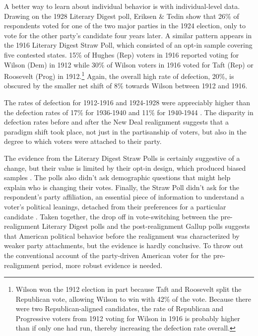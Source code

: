 \documentclass[11pt]{scrartcl}\usepackage[]{graphicx}\usepackage[]{color}
\begin{document}
A better way to learn about individual behavior is with individual-level data.  Drawing on the 1928 Literary Digest poll, Eriksen \& Tedin \citeyearpar{erikson1981partisan} show that 26\% of respondents voted for one of the two major parties in the 1924 election, only to vote for the other party's candidate four years later. A similar pattern appears in the 1916 Literary Digest Straw Poll, which consisted of an opt-in sample covering five contested states. 15\% of Hughes (Rep) voters in 1916 reported voting for Wilson (Dem) in 1912 while 30\% of Wilson voters in 1916 voted for Taft (Rep) or Roosevelt (Prog) in 1912.\footnote{Wilson won the 1912 election in part because Taft and Roosevelt split the Republican vote, allowing Wilson to win with 42\% of the vote. Because there were two Republican-aligned candidates, the rate of Republican and Progressive voters from 1912 voting for Wilson in 1916 is probably higher than if only one had run, thereby increasing the defection rate overall.} Again, the overall high rate of defection, 20\%, is obscured by the smaller net shift of 8\% towards Wilson between 1912 and 1916.  

The rates of defection for 1912-1916 and 1924-1928 were appreciably higher than the defection rates of 17\% for 1936-1940 and 11\% for 1940-1944 \citep{erikson1981partisan,key1966responsible}. The disparity in defection rates before and after the New Deal realignment suggests that a paradigm shift took place, not just in the partisanship of voters, but also in the degree to which voters were attached to their party.

The evidence from the Literary Digest Straw Polls is certainly suggestive of a change, but their value is limited by their opt-in design, which produced biased samples \citep{squire19881936}. The polls also didn't ask demographic questions that might help explain who is changing their votes. Finally, the Straw Poll didn't ask for the respondent's party affiliation, an essential piece of information to understand a voter's political leanings, detached from their preferences for a particular candidate \citep{campbell1960american}. Taken together, the drop off in vote-switching between the pre-realignment Literary Digest polls and the post-realignment Gallup polls suggests that American political behavior before the realignment was characterized by weaker party attachments, but the evidence is hardly conclusive. To throw out the conventional account of the party-driven American voter for the pre-realignment period, more robust evidence is needed. 
\end{document}
